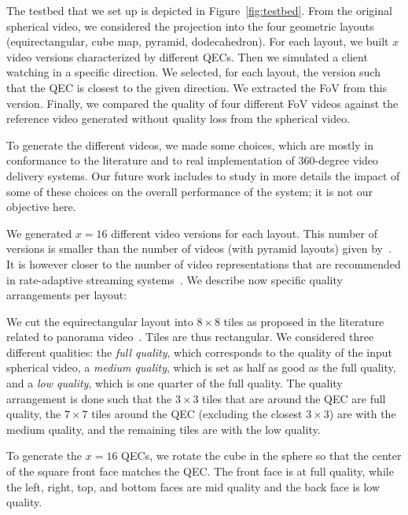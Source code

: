 The testbed that we
set up is depicted in Figure~\ref{fig:testbed}. From the original spherical video, we considered the
projection
into the four geometric layouts (equirectangular, cube map, pyramid, dodecahedron). For
each layout, we built
$x$ video versions characterized by different \acp{QEC}. Then we simulated
a client watching in a specific direction. We selected, for each layout, the version such that the \ac{QEC}
is closest to the given direction. We extracted the \ac{FoV} from this version. Finally, we compared
the quality of four different \ac{FoV} videos against the reference video generated
without quality loss from the spherical video.



To generate the different videos, we made some choices, which are mostly in conformance to the
literature and to real implementation of 360-degree video delivery systems. Our future work
includes to study in more details the impact of some of these choices on
the overall performance of the system; it is not our objective here.

We generated $x=16$ different video versions for each layout. This number of versions is smaller than
the number of videos (with pyramid layouts) given by~\citet{facebook}. It is however closer to the
number of video representations that are recommended in rate-adaptive streaming
systems~\cite{Aparicio-PardoP15}. We describe now specific quality arrangements per layout:

We cut the equirectangular layout into $8\times 8$ tiles as proposed in
the literature related to panorama video~\cite{gaddam_tiling_2015}. Tiles are thus rectangular.
We considered three different qualities: the \emph{full quality}, which corresponds to the quality of the
input spherical video, a \emph{medium quality}, which is set as half as good as the full quality, and a
\emph{low quality}, which is one quarter of the full quality. The quality arrangement is done such that
the $3\times 3$ tiles that are around the \ac{QEC} are full quality, the $7\times 7$ tiles around
the \ac{QEC} (excluding the closest $3\times 3$) are with the medium quality, and the remaining tiles
are with the low quality.

To generate the $x=16$ \acp{QEC}, we rotate the cube in the sphere so that the
center of the square front face matches the \ac{QEC}. The front face is at full quality, while the left, right,
top, and bottom faces are mid quality and the back face is low quality.

